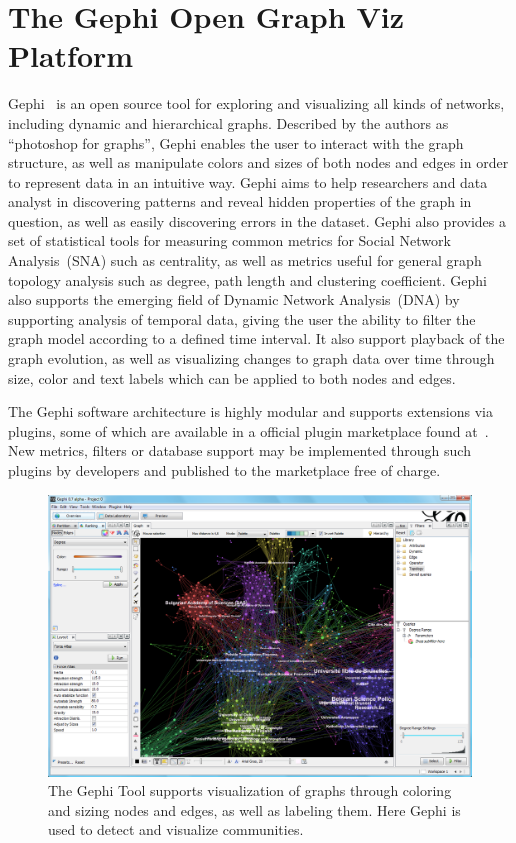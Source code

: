 \section{The Gephi Open Graph Viz Platform} Gephi~\cite{ICWSM09154} is
an open source tool for exploring and visualizing all kinds of networks,
including dynamic and hierarchical graphs. Described by the authors as
``photoshop for graphs'', Gephi enables the user to interact with the
graph structure, as well as manipulate colors and sizes of both nodes
and edges in order to represent data in an intuitive way. Gephi aims to
help researchers and data analyst in discovering patterns and reveal
hidden properties of the graph in question, as well as easily
discovering errors in the dataset. Gephi also provides a set of
statistical tools for measuring common metrics for Social Network
Analysis~(SNA) such as centrality, as well as metrics useful for general
graph topology analysis such as degree, path length and clustering
coefficient. Gephi also supports the emerging field of Dynamic Network
Analysis~(DNA) by supporting analysis of temporal data, giving the user
the ability to filter the graph model according to a defined time
interval. It also support playback of the graph evolution, as well as
visualizing changes to graph data over time through size, color and text
labels which can be applied to both nodes and edges.

The Gephi software architecture is highly modular and supports
extensions via plugins, some of which are available in a official plugin
marketplace found at~\cite{gephimarketplace}. New metrics, filters or
database support may be implemented through such plugins by developers
and published to the marketplace free of charge.

\begin{figure}
\centering
\includegraphics[width=\textwidth]{img/gephi1}
\caption{The Gephi Tool supports
visualization of graphs through coloring and sizing nodes and
edges, as well as labeling them. Here Gephi is used to detect and visualize
communities.}
\label{img:gephi1}
\end{figure}

